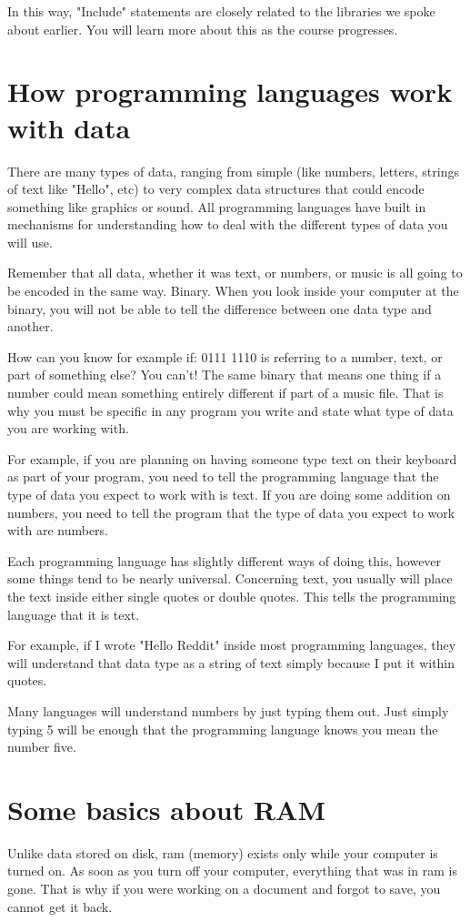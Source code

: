\documentclass[a4paper,12pt]{article}
\let\stdsection\section
\renewcommand\section{\newpage\stdsection}
\begin{document}
In this way, "Include" statements are closely related to the libraries we spoke about earlier. You will learn more about this as the course progresses.
\section{How programming languages work with data}
There are many types of data, ranging from simple (like numbers, letters, strings of text like "Hello", etc) to very complex data structures that could encode something like graphics or sound. All programming languages have built in mechanisms for understanding how to deal with the different types of data you will use.

Remember that all data, whether it was text, or numbers, or music is all going to be encoded in the same way. Binary. When you look inside your computer at the binary, you will not be able to tell the difference between one data type and another.

How can you know for example if: 0111 1110 is referring to a number, text, or part of something else? You can't! The same binary that means one thing if a number could mean something entirely different if part of a music file. That is why you must be specific in any program you write and state what type of data you are working with.

For example, if you are planning on having someone type text on their keyboard as part of your program, you need to tell the programming language that the type of data you expect to work with is text. If you are doing some addition on numbers, you need to tell the program that the type of data you expect to work with are numbers.

Each programming language has slightly different ways of doing this, however some things tend to be nearly universal. Concerning text, you usually will place the text inside either single quotes or double quotes. This tells the programming language that it is text.

For example, if I wrote "Hello Reddit" inside most programming languages, they will understand that data type as a string of text simply because I put it within quotes.

Many languages will understand numbers by just typing them out. Just simply typing 5 will be enough that the programming language knows you mean the number five.
\section{Some basics about RAM}
Unlike data stored on disk, ram (memory) exists only while your computer is turned on. As soon as you turn off your computer, everything that was in ram is gone. That is why if you were working on a document and forgot to save, you cannot get it back.
\end{document}

